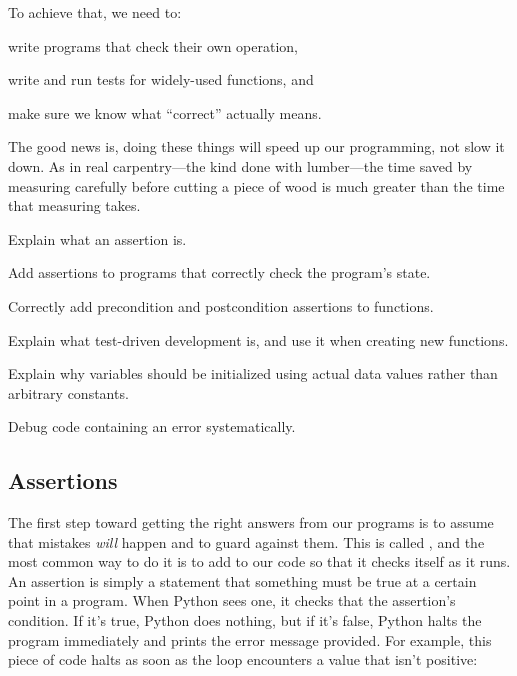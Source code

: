 \documentclass{book}
\begin{document}
To achieve that, we need to:

\begin{swcitemize}
\item
  write programs that check their own operation,
\item
  write and run tests for widely-used functions, and
\item
  make sure we know what ``correct'' actually means.
\end{swcitemize}

The good news is, doing these things will speed up our programming, not
slow it down. As in real carpentry---the kind done with lumber---the
time saved by measuring carefully before cutting a piece of wood is much
greater than the time that measuring takes.

\begin{objectives}
\begin{swcitemize}
\item
  Explain what an assertion is.
\item
  Add assertions to programs that correctly check the program's state.
\item
  Correctly add precondition and postcondition assertions to functions.
\item
  Explain what test-driven development is, and use it when creating new
  functions.
\item
  Explain why variables should be initialized using actual data values
  rather than arbitrary constants.
\item
  Debug code containing an error systematically.
\end{swcitemize}
\end{objectives}

\subsection{Assertions}

The first step toward getting the right answers from our programs is to
assume that mistakes \emph{will} happen and to guard against them. This
is called , and
the most common way to do it is to add
 to our code so that it checks itself
as it runs. An assertion is simply a statement that something must be
true at a certain point in a program. When Python sees one, it checks
that the assertion's condition. If it's true, Python does nothing, but
if it's false, Python halts the program immediately and prints the error
message provided. For example, this piece of code halts as soon as the
loop encounters a value that isn't positive:
\end{document}
